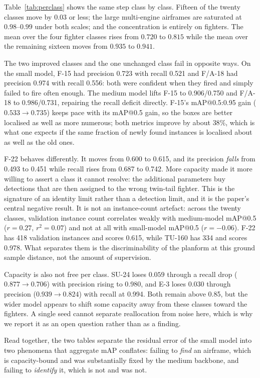 \documentclass[conference]{IEEEtran}
\begin{document}
Table~\ref{tab:perclass} shows the same step class by class. Fifteen of the
twenty classes move by $0.03$ or less; the large multi-engine airframes are
saturated at $0.98$--$0.99$ under both scales; and the concentration is entirely
on fighters. The mean over the four fighter classes rises from $0.720$ to
$0.815$ while the mean over the remaining sixteen moves from $0.935$ to $0.941$.

The two improved classes and the one unchanged class fail in opposite ways. On
the small model, F-15 had precision 0.723 with recall 0.521 and F/A-18 had
precision 0.974 with recall 0.556: both were confident when they fired and
simply failed to fire often enough. The medium model lifts F-15 to 0.906/0.750
and F/A-18 to 0.986/0.731, repairing the recall deficit directly. F-15's
mAP@0.5:0.95 gain ($0.533\rightarrow0.735$) keeps pace with its mAP@0.5 gain, so
the boxes are better localised as well as more numerous; both metrics improve by
about $38\%$, which is what one expects if the same fraction of newly found
instances is localised about as well as the old ones.

F-22 behaves differently. It moves from 0.600 to 0.615, and its precision
\emph{falls} from 0.493 to 0.451 while recall rises from 0.687 to 0.742. More
capacity made it more willing to assert a class it cannot resolve: the additional
parameters buy detections that are then assigned to the wrong twin-tail fighter.
This is the signature of an identity limit rather than a detection limit, and it
is the paper's central negative result. It is not an instance-count artefact:
across the twenty classes, validation instance count correlates weakly with
medium-model mAP@0.5 ($r=0.27$, $r^2=0.07$) and not at all with small-model
mAP@0.5 ($r=-0.06$). F-22 has 418 validation instances and scores 0.615, while
TU-160 has 334 and scores 0.978. What separates them is the discriminability of
the planform at this ground sample distance, not the amount of supervision.

Capacity is also not free per class. SU-24 loses $0.059$ through a recall drop
($0.877\rightarrow0.706$) with precision rising to 0.980, and E-3 loses $0.030$
through precision ($0.939\rightarrow0.824$) with recall at 0.994. Both remain
above 0.85, but the wider model appears to shift some capacity away from these
classes toward the fighters. A single seed cannot separate reallocation from
noise here, which is why we report it as an open question rather than as a
finding.

Read together, the two tables separate the residual error of the small model into
two phenomena that aggregate mAP conflates: failing to \emph{find} an airframe,
which is capacity-bound and was substantially fixed by the medium backbone, and
failing to \emph{identify} it, which is not and was not.
\end{document}
